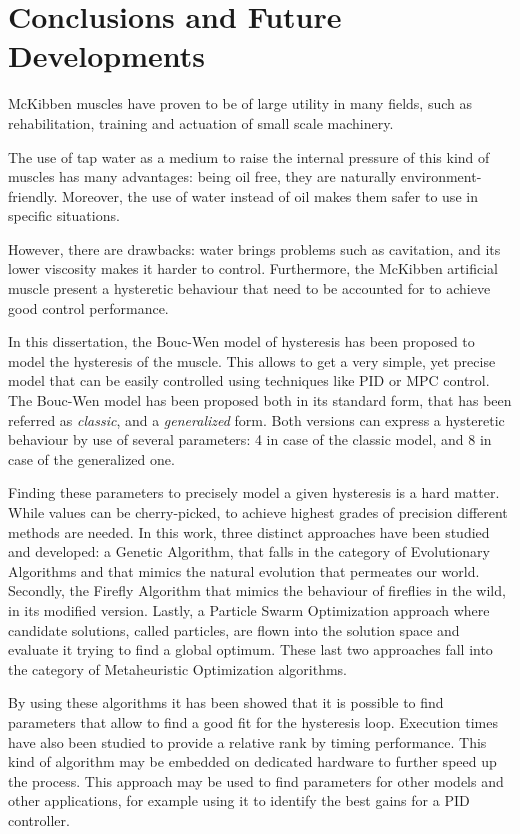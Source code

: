 \chapter{Conclusions and Future Developments}
\label{ch:conclusion}

McKibben muscles have proven to be of large utility in many fields,
such as rehabilitation, training and actuation of small scale machinery.

The use of tap water as a medium to raise the internal pressure of this kind of muscles
has many advantages: being oil free, they are naturally environment-friendly. Moreover,
the use of water instead of oil makes them safer to use in specific situations.

However, there are drawbacks: water brings problems such as cavitation,
and its lower viscosity makes it harder to control. Furthermore, the McKibben
artificial muscle present a hysteretic behaviour that need to be accounted for
to achieve good control performance.

In this dissertation, the Bouc-Wen model of hysteresis has been proposed
to model the hysteresis of the muscle. This allows to get a very simple,
yet precise model that can be easily controlled using techniques like PID
or MPC control. The Bouc-Wen model has been proposed both in its standard form,
that has been referred as \emph{classic}, and a \emph{generalized} form.
Both versions can express a hysteretic behaviour by use of several
parameters: 4 in case of the classic model, and 8 in case of the generalized one.

Finding these parameters to precisely model a given hysteresis is a hard matter.
While values can be cherry-picked, to achieve highest grades of precision
different methods are needed. In this work, three distinct approaches
have been studied and developed: a Genetic Algorithm, that falls in the category
of Evolutionary Algorithms and that mimics the natural evolution that permeates our world.
Secondly, the Firefly Algorithm that mimics the behaviour of fireflies in the wild,
in its modified version. Lastly, a Particle Swarm Optimization approach where
candidate solutions, called particles, are flown into the solution space and evaluate
it trying to find a global optimum. These last two approaches fall into the category
of Metaheuristic Optimization algorithms.

By using these algorithms it has been showed that it is possible to find parameters
that allow to find a good fit for the hysteresis loop.
Execution times have also been studied to provide a relative rank by timing performance.
This kind of algorithm may be embedded on dedicated hardware
to further speed up the process. This approach may be used
to find parameters for other models and other applications, for example using it
to identify the best gains for a PID controller.

